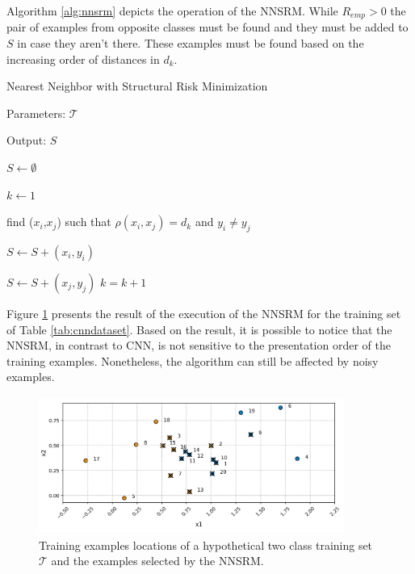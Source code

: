 Algorithm \ref{alg:nnsrm} depicts the operation of the NNSRM. While $R_{emp} > 0$ the pair of examples from opposite classes must be found and they must be added to $S$ in case they aren't there. These examples must be found based on the increasing order of distances in $d_k$.

\vspace{0.2cm}

\begin{algorithm}[H]
    \label{alg:nnsrm}
    \caption{Nearest Neighbor with Structural Risk Minimization}
    
    Parameters: $\mathcal{T}$
    
    Output: $S$
    
    
    \begin{algorithmic}[1] 
    \STATE $S \gets \emptyset$
   
    \STATE $k \gets 1$ 
   
   
   
    \STATE find ($x_i$,$x_j$) such that $\rho(x_i,x_j) = d_k$ and $y_i \neq y_j$     
    
            \STATE $S \gets S + (x_i, y_i)$
    \ENDIF
    
          \STATE $S \gets S + (x_j, y_j)$
    \ENDIF
    \STATE $k = k + 1$     
    
    \ENDWHILE 
    \end{algorithmic}
    
    
\end{algorithm}

\vspace{0.2cm}

Figure \ref{fig:nnsrmdataset} presents the result of the execution of the NNSRM for the training set of Table \ref{tab:cnndataset}. Based on the result, it is possible to notice that the NNSRM, in contrast to CNN, is not sensitive to the presentation order of the training examples. Nonetheless, the algorithm can still be affected by noisy examples. 

\begin{figure}[ht!]
    \centering
    \includegraphics[height = 4.5cm, width =  10cm]{figures/nnsrmdataset.png}
    \caption{Training examples locations of a hypothetical two class training set $\mathcal{T}$ and the examples selected by the NNSRM.}
    \label{fig:nnsrmdataset}
\end{figure}

